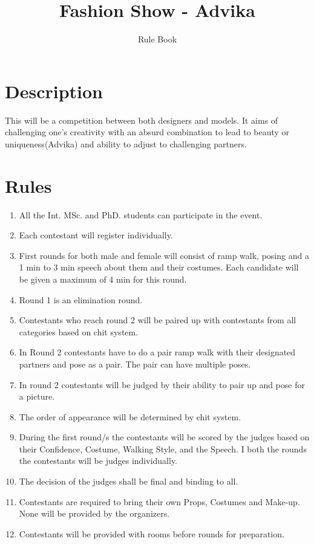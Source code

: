 \documentclass[a4paper, 11pt]{proc}
\begin{document}
\title{Fashion Show - Advika}
\author{Rule Book}
\maketitle

\section*{Description}
This will be a competition between both designers and models. It aims of challenging one's creativity with an absurd combination to lead to beauty or uniqueness(Advika) and ability to adjust to challenging partners.
\section*{Rules}
\begin{enumerate}
	\item All the Int. MSc. and PhD. students can participate in the event.
	\item Each contestant will register individually.
	\item First rounds for both male and female will consist of ramp walk, posing and a 1 min to 3 min speech about them and their costumes. Each candidate will be given a maximum of 4 min for this round.
	\item Round 1 is an elimination round.
	\item Contestants who reach round 2 will be paired up with contestants from all categories based on chit system.
	\item In Round 2 contestants have to do a pair ramp walk with their designated partners and pose as a pair. The pair can have multiple poses.
	\item In round 2 contestants will be judged by their ability to pair up and pose for a picture.
	\item The order of appearance will be determined by chit system.
	\item During the first round/s the contestants will be scored by the judges based on their Confidence, Costume, Walking Style, and the Speech. I both the rounds the contestants will be judges individually.
	\item The decision of the judges shall be final and binding to all.
	\item Contestants are required to bring their own Props, Costumes and Make-up. None will be provided by the organizers.
	\item Contestants will be provided with rooms before rounds for preparation.

\end{enumerate}
\end{document}
